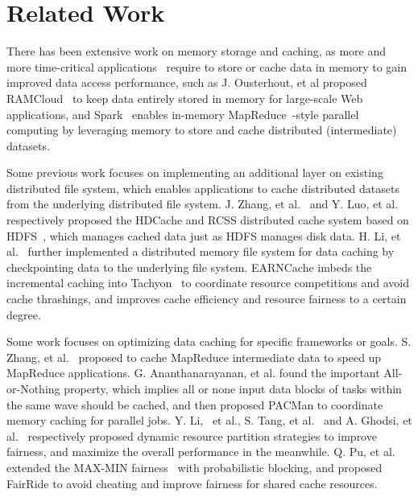\section{Related Work}\label{sec:RelatedWork}

There has been extensive work on memory storage and caching, as more and more time-critical applications~\cite{redis,memcached} require to store or cache data in memory to gain improved data access performance, such as J. Ousterhout, et al proposed RAMCloud~\cite{ramcloud} to keep data entirely stored in memory for large-scale Web applications, and Spark~\cite{spark,rdd} enables in-memory MapReduce~\cite{mapreduce}-style parallel computing by leveraging memory to store and cache distributed (intermediate) datasets.


Some previous work focuses on implementing an additional layer on existing distributed file system, which enables applications to cache distributed datasets from the underlying distributed file system. J. Zhang, et al.~\cite{dist-cache-hdfs} and Y. Luo, et al.~\cite{rcss} respectively proposed the HDCache and RCSS distributed cache system based on HDFS~\cite{hdfs1,hdfs2}, which manages cached data just as HDFS manages disk data. H. Li, et al.~\cite{tachyon} further implemented a distributed memory file system for data caching by checkpointing data to the underlying file system. EARNCache imbeds the incremental caching into Tachyon~\cite{tachyon} to coordinate resource competitions and avoid cache thrashings, and improves cache efficiency and resource fairness to a certain degree.

Some work focuses on optimizing data caching for specific frameworks or goals. S. Zhang, et al.~\cite{mapreduce-cache} proposed to cache MapReduce intermediate data to speed up MapReduce applications. G. Ananthanarayanan, et al.\cite{pacman} found the important All-or-Nothing property, which implies all or none input data blocks of tasks within the same wave should be cached, and then proposed PACMan to coordinate memory caching for parallel jobs. Y. Li, ~et al.\cite{rate-aware}, S. Tang, et al.~\cite{ltrf} and A. Ghodsi, et al.~\cite{drf} respectively proposed dynamic resource partition strategies to improve fairness, and maximize the overall performance in the meanwhile. Q. Pu, et al.~\cite{fairride} extended the MAX-MIN fairness~\cite{maxmin,maxmin2} with probabilistic blocking, and proposed FairRide to avoid cheating and improve fairness for shared cache resources.

